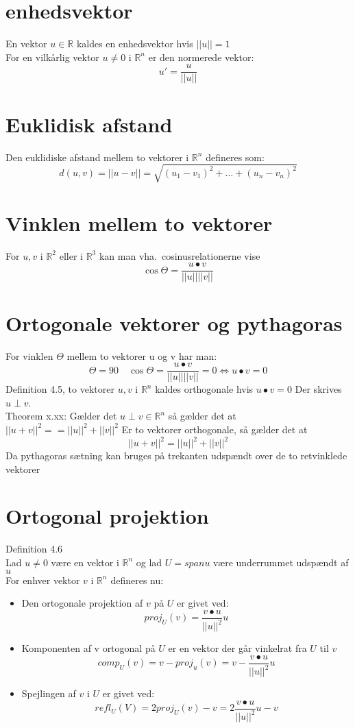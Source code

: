 \documentclass[a4paper,fleqn]{report}
\newcommand{\RR}{\mathbb{R}}
\begin{document}
	\section{enhedsvektor}
	En vektor $u \in \RR$ kaldes en enhedsvektor hvis $||u|| = 1$\\
	For en vilkårlig vektor $u \neq 0$ i $\RR^n$ er den normerede vektor:
	\[u' = \frac{u}{||u||} \]
	

	\section{Euklidisk afstand}
	Den euklidiske afstand mellem to vektorer i $\RR^n$ defineres som:
	\[d(u,v) = ||u-v|| = \sqrt{(u_1 - v_1)^2 + \dots + (u_n-v_n)^2}\]

	\section{Vinklen mellem to vektorer}
	For $u,v$ i $\RR^2$ eller i $\RR^3$ kan man vha.\ cosinusrelationerne vise 
	\[\cos \Theta = \frac{u\bullet v}{||u||||v||}\]

	\section{Ortogonale vektorer og pythagoras}
	For vinklen $\Theta$ mellem to vektorer u og v har man:
	\[ \Theta = 90 \quad \cos \Theta = \frac{u\bullet v}{||u||||v||} = 0 
	\Leftrightarrow u \bullet v = 0\]
	Definition 4.5, to vektorer $u,v$ i $\RR^n$ kaldes orthogonale hvis $u \bullet v = 0$
	Der skrives $u \perp v$.\\

	Theorem x.xx: Gælder det $u\perp v \in \RR^n$ så gælder det at $||u+v||^2 == ||u||^2 + ||v||^2$
	Er to vektorer orthogonale, så gælder det at \[ ||u+v||^2 = ||u||^2 + ||v||^2 \] Da 
	pythagoras sætning kan bruges på trekanten udspændt over de to retvinklede vektorer

	\section{Ortogonal projektion}
	Definition 4.6\\
	Lad $u \neq 0$ være en vektor i $\RR^n$ og lad $U = span u$ være underrummet udspændt af 
	$u$\\
	For enhver vektor $v$ i $\RR^n$ defineres nu:

	\begin{itemize}
		\item Den ortogonale projektion af $v$ på $U$ er givet ved:
			\[ proj_U(v) = \frac{v\bullet u}{||u||^2}u \]

		\item Komponenten af v ortogonal på $U$ er en vektor der går vinkelrat fra $U$ til $v$
		\[comp_U(v) = v - proj_u(v) = v-\frac{v\bullet u}{||u||^2} u\]

		\item Spejlingen af $v$ i $U$ er givet ved:
		\[ refl_U(V) = 2proj_U(v) - v = 2\frac{v\bullet u}{||u||^2}u - v \]
	\end{itemize}
\end{document}
